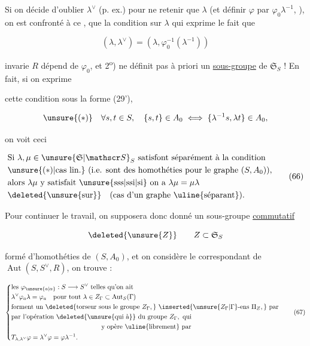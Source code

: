 Si on décide d'oublier $\lambda^\vee$ (p. ex.) pour ne retenir que $\lambda$ (et définir $\varphi$ par $\varphi_0\lambda^{-1}$, ), on est confronté à ce , que la condition sur $\lambda$ qui exprime le  fait que

\[
(\lambda,\lambda^\vee)=(\lambda,\varphi_0^{-1}(\lambda^{-1}))
\]

 invarie $R$  dépend de $\varphi_0$, et 2\textsuperscript{o}) ne définit pas à priori un \uline{sous-groupe} de $\mathfrak S_S$ ! En fait, si on exprime

cette condition sous la forme (29'),

\[
\unsure{(*)}\quad\forall s,t\in S,\quad\{s,t\}\in A_0\iff\{\lambda^{-1}s,\lambda t\}\in A_0,
\]

on voit ceci

\[
\begin{aligned}
&\text{Si }\lambda,\mu\in\unsure{\mathfrak S|\mathscr S}_S\ \text{satisfont séparément à la condition}\\
&\unsure{(*)|\text{cas lin.}}\ \text{(i.e. sont des homothéties pour le graphe }(S,A_0)),\\
&\text{alors }\lambda\mu\ \text{y satisfait \unsure{sss|ssi|si} on a }\lambda\mu=\mu\lambda\\
&\deleted{\text{\unsure{sur}}}\quad\text{(cas d'un graphe \uline{séparant}).}
\end{aligned} \tag*{(66)}
\]

Pour continuer le travail, on supposera donc donné un sous-groupe \uline{commutatif}

\[
\deleted{\unsure{Z}}\qquad Z\subset\mathfrak S_S
\]

formé d'homothéties de $(S,A_0)$, et on considère  le   correspondant  de  $\operatorname{Aut}(S,S^\vee,R)$, on trouve : 

\[
\left\{\begin{aligned}
&\text{les }\varphi_{\unsure{a|\alpha}}:S\longrightarrow S^\vee\ \text{telles qu'on ait}\\
&\lambda^\vee\varphi_a\lambda=\varphi_a\quad\text{pour tout }\lambda\in Z_\Gamma\subset\operatorname{Aut}_S(\Gamma)\\
&\text{forment un }\deleted{\text{torseur sous le groupe }Z_\Gamma,}\ \inserted{\unsure{Z_\Gamma|\Gamma}\text{-ens }\Pi_Z,}\ \text{par}\\
&\text{par l'opération }\deleted{\text{\unsure{qui à}}}\ \text{du groupe }Z_\Gamma,\ \text{qui}\\
&\hspace{48mm}\text{y opère \uline{librement} par}\\
&T_{\lambda,\lambda^\vee}\varphi=\lambda^\vee\varphi=\varphi\lambda^{-1}.
\end{aligned}\right. \tag*{(67)}
\]

